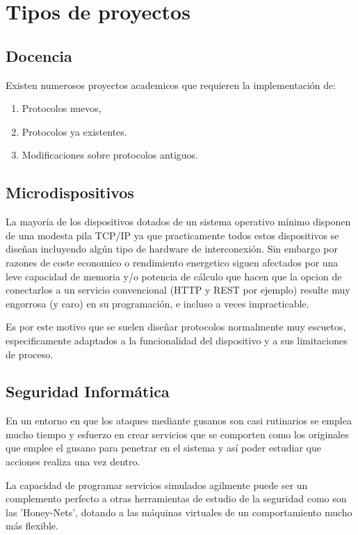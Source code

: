 \documentclass[a4paper,spanish,12pt]{book}
\begin{document}
\section{Tipos de proyectos}
\subsection{Docencia}
Existen numerosos proyectos academicos que requieren la implementaci\'on de:
\begin{enumerate}
	\item Protocolos nuevos,
	\item Protocolos ya existentes.
	\item Modificaciones sobre protocolos antiguos. 
\end{enumerate}

\subsection{Microdispositivos}
La mayor\'ia de los dispositivos dotados de un sistema operativo m\'inimo disponen de una modesta pila TCP/IP ya que practicamente todos estos dispositivos se dise\~{n}an incluyendo algún tipo de hardware de interconexi\'on. Sin embargo por razones de coste economico o rendimiento energetico siguen afectados por una leve capacidad de memoria y/o potencia de c\'alculo que hacen que la opcion de conectarlos a un servicio convencional (HTTP y REST por ejemplo) resulte muy engorrosa (y caro) en su programaci\'on, e incluso a veces impracticable.

Es por este motivo que se suelen dise\~{n}ar protocolos normalmente muy escuetos, especificamente adaptados a la funcionalidad del dispositivo y a sus limitaciones de proceso.

\subsection{Seguridad Inform\'atica}
En un entorno en que los ataques mediante gusanos son casi rutinarios se emplea mucho tiempo y esfuerzo en crear servicios que se comporten como los originales que emplee el gusano para penetrar en el sistema y as\'i poder estudiar que acciones realiza una vez dentro.

La capacidad de programar servicios simulados agilmente puede ser un complemento perfecto a otras herramientas de estudio de la seguridad como son las 'Honey-Nets', dotando a las m\'aquinas virtuales de un comportamiento mucho m\'as flexible.
\end{document}
